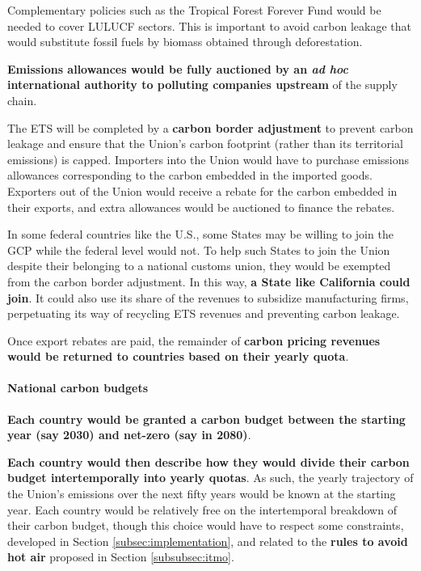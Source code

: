 \documentclass[12pt,english]{article}
\begin{document}
Complementary policies such as the Tropical Forest Forever Fund would be needed to cover LULUCF sectors. This is important to avoid carbon leakage that would substitute fossil fuels by biomass obtained through deforestation.

\textbf{Emissions allowances would be fully auctioned by an \textit{ad hoc} international authority to polluting companies upstream} of the supply chain. 

The ETS will be completed by a \textbf{carbon border adjustment} to prevent carbon leakage and ensure that the Union's carbon footprint (rather than its territorial emissions) is capped. Importers into the Union would have to purchase emissions allowances corresponding to the carbon embedded in the imported goods. Exporters out of the Union would receive a rebate for the carbon embedded in their exports, and extra allowances would be auctioned to finance the rebates. 

In some federal countries like the U.S., some States may be willing to join the GCP while the federal level would not. To help such States to join the Union despite their belonging to a national customs union, they would be exempted from the carbon border adjustment. In this way, \textbf{a State like California could join}. It could also use its share of the revenues to subsidize manufacturing firms, perpetuating its way of recycling ETS revenues and preventing carbon leakage.

Once export rebates are paid, the remainder of \textbf{carbon pricing revenues would be returned to countries based on their yearly quota}.


\paragraph{National carbon budgets}
\textbf{Each country would be granted a carbon budget between the starting year (say 2030) and net-zero (say in 2080)}. 

\textbf{Each country would then describe how they would divide their carbon budget intertemporally into yearly quotas}. As such, the yearly trajectory of the Union's emissions over the next fifty years would be known at the starting year. Each country would be relatively free on the intertemporal breakdown of their carbon budget, though this choice would have to respect some constraints, developed in Section \ref{subsec:implementation}, and related to the \textbf{rules to avoid hot air} proposed in Section \ref{subsubsec:itmo}.
\end{document}
